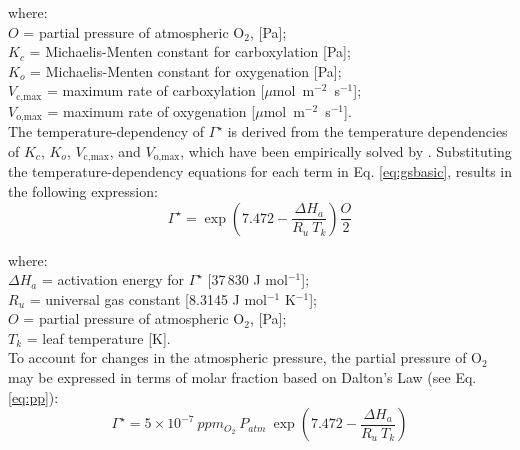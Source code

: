 \noindent where:\\
\indent $O$ = partial pressure of atmospheric O$_2$, [Pa];\\
\indent $K_c$ = Michaelis-Menten constant for carboxylation [Pa];\\
\indent $K_o$ = Michaelis-Menten constant for oxygenation [Pa];\\
\indent $V_\text{c,max}$ = maximum rate of carboxylation [$\mu$mol~m$^{-2}$~s$^{-1}$];\\
\indent $V_\text{o,max}$ = maximum rate of oxygenation [$\mu$mol~m$^{-2}$~s$^{-1}$].\\

\noindent The temperature-dependency of $\Gamma^\star$ is derived from the temperature dependencies of $K_c$, $K_o$, $V_\text{c,max}$, and $V_\text{o,max}$, which have been empirically solved by \cite{bernacchi01}. 
Substituting the temperature-dependency equations for each term in Eq. \ref{eq:gsbasic}, results in the following expression:
\begin{equation}
\label{eq:gst}
    \Gamma^\star = \exp \left(7.472 - \frac{\Delta H_a}{R_u\: T_k}\right) \frac{O}{2}
\end{equation}

\noindent where:\\
\indent $\Delta H_a$ = activation energy for $\Gamma^\star$ [37$\,$830 J mol$^{-1}$];\\
\indent $R_u$ = universal gas constant [8.3145 J mol$^{-1}$ K$^{-1}$];\\
\indent $O$ = partial pressure of atmospheric O$_2$, [Pa];\\
\indent $T_k$ = leaf temperature [K].\\

\noindent To account for changes in the atmospheric pressure, the partial pressure of O$_2$ may be expressed in terms of molar fraction based on Dalton's Law (see Eq. \ref{eq:pp}):
\begin{equation}
\label{eq:gstpa}
    \Gamma^\star = 5\times 10^{-7}\: ppm_{O_2}\: P_{atm}\: \exp \left(7.472 - \frac{\Delta H_a}{R_u\: T_k}\right)
\end{equation}

